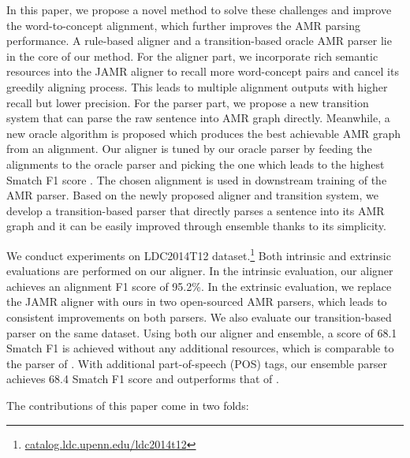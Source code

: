 \documentclass[11pt,a4paper]{article}
\begin{document}
In this paper, we propose a novel method to solve these challenges and
improve the word-to-concept alignment,
which further improves the AMR parsing performance.
A rule-based aligner and 
a transition-based oracle AMR parser
lie in the core of our method.
For the aligner part, we
incorporate rich semantic resources into the JAMR aligner
to recall more word-concept pairs
and cancel its greedily aligning process. 
This leads to multiple alignment outputs with higher recall but lower precision.
For the parser part,
we propose a new transition system that can parse the raw
sentence into AMR graph directly.
Meanwhile, a new oracle algorithm is proposed which
produces the best achievable AMR graph from an alignment.
Our aligner is tuned by our oracle parser by feeding the alignments
to the oracle parser and picking the one which leads to
the highest Smatch F1 score \cite{cai-knight:2013:Short}.
The chosen alignment is used in downstream training of the AMR parser.
Based on the newly proposed aligner and transition system,
we develop a transition-based parser that directly parses a sentence
into its AMR graph and it can be easily improved through ensemble
thanks to its simplicity.

We conduct experiments on LDC2014T12 dataset.\footnote{\url{catalog.ldc.upenn.edu/ldc2014t12}}
Both intrinsic and extrinsic evaluations are performed on our aligner.
In the intrinsic evaluation, our aligner achieves an alignment F1 score of 95.2\%.
In the extrinsic evaluation, we replace the JAMR aligner with ours
in two open-sourced AMR parsers, which leads to consistent improvements on both parsers.
We also evaluate our transition-based parser on the same dataset.
Using both our aligner and ensemble, a score of
68.1 Smatch F1 is achieved
without any additional resources, which is comparable to the parser of \citet{wang-xue:2017:EMNLP2017}.
With additional part-of-speech (POS) tags,
our ensemble parser
achieves 68.4 Smatch F1 score and
outperforms that of \citet{wang-xue:2017:EMNLP2017}.

The contributions of this paper come in two folds:
\end{document}

